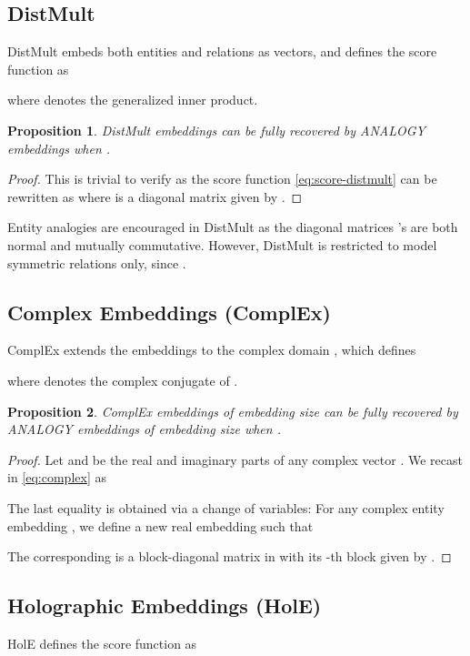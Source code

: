 \documentclass{article}
\newtheorem{proposition}{Proposition}[section]
\begin{document}
\subsection{DistMult}
DistMult \cite{DBLP:journals/corr/YangYHGD14a} embeds both entities and relations as
vectors, and defines the score function as

where  denotes the generalized inner product.

\begin{proposition}
    DistMult embeddings can be fully recovered by ANALOGY embeddings when .
\end{proposition}
\begin{proof}
    This is trivial to verify as the score function \eqref{eq:score-distmult} can be rewritten as 
    where  is a diagonal matrix given by .
\end{proof}
Entity analogies are encouraged in DistMult as the diagonal matrices 's are both normal and mutually commutative.
However, DistMult is restricted to model symmetric relations only, since .

\subsection{Complex Embeddings (ComplEx)}
ComplEx \cite{DBLP:conf/icml/TrouillonWRGB16} extends the embeddings to the complex domain ,
which defines

where  denotes the complex conjugate of .

\begin{proposition}
    ComplEx embeddings of embedding size  can be fully recovered by ANALOGY embeddings
    of embedding size  when .
\end{proposition}

\begin{proof}
    Let  and  be the real and imaginary parts of any complex vector . We recast  in \eqref{eq:complex} as

The last equality is obtained via a change of variables:
For any complex entity embedding ,
we define a new real embedding  such that

The corresponding  is a block-diagonal matrix in  with its -th block given by
.
\end{proof}



\subsection{Holographic Embeddings (HolE)}
HolE \cite{DBLP:conf/aaai/NickelRP16} defines the score function as
\end{document}
